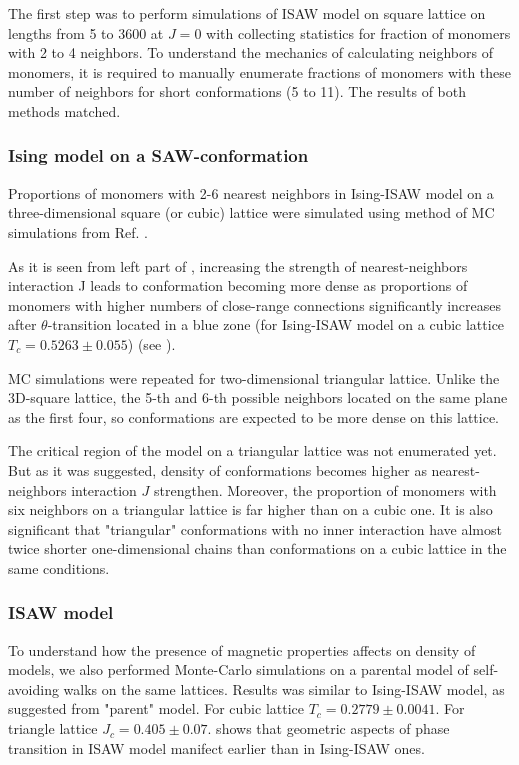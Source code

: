 The first step was to perform simulations of ISAW model on square lattice on lengths from 5 to 3600 at $J=0$ with collecting statistics for fraction of monomers with 2 to 4 neighbors. 
To understand the mechanics of calculating neighbors of monomers, it is required to manually enumerate fractions of monomers with these number of neighbors for short conformations (5 to 11). 
The results of both methods matched.


\subsubsection{Ising model on a SAW-conformation}

Proportions of monomers with 2-6 nearest neighbors in Ising-ISAW model on a three-dimensional square (or cubic) lattice were simulated using method of MC simulations from Ref. \cite{faizullina2021critical}.

As it is seen from left part of , increasing the strength of nearest-neighbors interaction J leads to conformation becoming more dense as proportions of monomers with higher numbers of close-range connections significantly increases after $\theta$-transition located in a blue zone (for Ising-ISAW model on a cubic lattice $T_{c} = 0.5263 \pm 0.055$\cite{Foster2021}) (see ).

MC simulations were repeated for two-dimensional triangular lattice. 
Unlike the 3D-square lattice, the 5-th and 6-th possible neighbors located on the same plane as the first four, so conformations are expected to be more dense on this lattice.

The critical region of the model on a triangular lattice was not enumerated yet. 
But as it was suggested, density of conformations becomes higher as nearest-neighbors interaction $J$ strengthen. 
Moreover, the proportion of monomers with six neighbors on a triangular lattice is far higher than on a cubic one. 
It is also significant that "triangular" conformations with no inner interaction have almost twice shorter one-dimensional chains than conformations on a cubic lattice in the same conditions.

\subsubsection{ISAW model}

To understand how the presence of magnetic properties affects on density of models, we also performed Monte-Carlo simulations on a parental model of self-avoiding walks on the same lattices. Results was similar to Ising-ISAW model, as suggested from "parent" model. For cubic lattice $T_{c} = 0.2779\pm 0.0041 $\cite{Tesi1996}. For triangle lattice $J_{c} = 0.405 \pm 0.07 $\cite{Privman1986}.  shows that geometric aspects of phase transition in ISAW model manifect earlier than in Ising-ISAW ones.  



